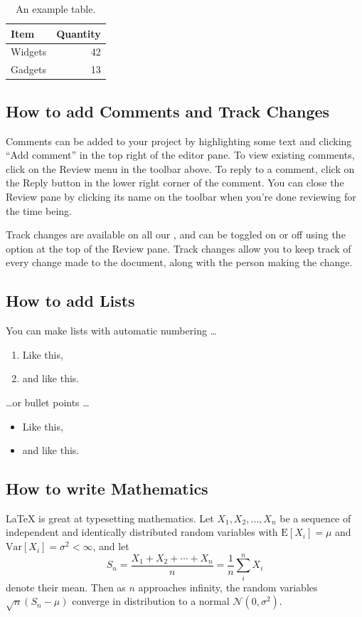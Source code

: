 \begin{table}
\centering
\begin{tabular}{l|r}
Item & Quantity \\\hline
Widgets & 42 \\
Gadgets & 13
\end{tabular}
\caption{\label{tab:widgets}An example table.}
\end{table}

\subsection{How to add Comments and Track Changes}

Comments can be added to your project by highlighting some text and clicking ``Add comment'' in the top right of the editor pane. To view existing comments, click on the Review menu in the toolbar above. To reply to a comment, click on the Reply button in the lower right corner of the comment. You can close the Review pane by clicking its name on the toolbar when you're done reviewing for the time being.

Track changes are available on all our , and can be toggled on or off using the option at the top of the Review pane. Track changes allow you to keep track of every change made to the document, along with the person making the change. 

\subsection{How to add Lists}

You can make lists with automatic numbering \dots

\begin{enumerate}
\item Like this,
\item and like this.
\end{enumerate}
\dots or bullet points \dots
\begin{itemize}
\item Like this,
\item and like this.
\end{itemize}

\subsection{How to write Mathematics}

\LaTeX{} is great at typesetting mathematics. Let $X_1, X_2, \ldots, X_n$ be a sequence of independent and identically distributed random variables with $\text{E}[X_i] = \mu$ and $\text{Var}[X_i] = \sigma^2 < \infty$, and let
\[S_n = \frac{X_1 + X_2 + \cdots + X_n}{n}
      = \frac{1}{n}\sum_{i}^{n} X_i\]
denote their mean. Then as $n$ approaches infinity, the random variables $\sqrt{n}(S_n - \mu)$ converge in distribution to a normal $\mathcal{N}(0, \sigma^2)$.

